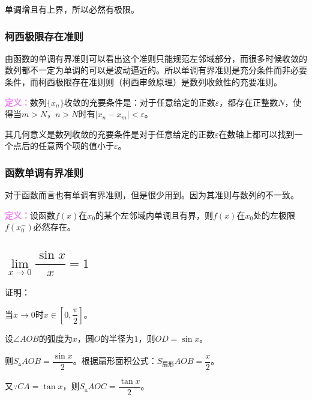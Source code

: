 \documentclass[UTF8, 12pt]{ctexart}
\begin{document}
单调增且有上界，所以必然有极限。

\subsubsection{柯西极限存在准则}

由函数的单调有界准则可以看出这个准则只能规范左邻域部分，而很多时候收敛的数列都不一定为单调的可以是波动逼近的。所以单调有界准则是充分条件而非必要条件，而柯西极限存在准则则（柯西审敛原理）是数列收敛性的充要准则。

\textcolor{violet}{\textbf{定义：}}数列$\{x_n\}$收敛的充要条件是：对于任意给定的正数$\varepsilon$，都存在正整数$N$，使得当$m>N$，$n>N$时有$\vert x_n-x_m\vert<\varepsilon$。

其几何意义是数列收敛的充要条件是对于任意给定的正数$\varepsilon$在数轴上都可以找到一个点后的任意两个项的值小于$\varepsilon$。

\subsubsection{函数单调有界准则}

对于函数而言也有单调有界准则，但是很少用到。因为其准则与数列的不一致。

\textcolor{violet}{\textbf{定义：}}设函数$f(x)$在$x_0$的某个左邻域内单调且有界，则$f(x)$在$x_0$处的左极限$f(x_0^-)$必然存在。

\subsection{\texorpdfstring{$\lim\limits_{x\to 0}\dfrac{\sin x}{x}=1$}{}}

证明：

\begin{minipage}{0.7\linewidth}
    当$x\to 0$时$x\in[0,\dfrac{\pi}{2}]$。

    设$\angle AOB$的弧度为$x$，圆$O$的半径为$1$，则$OD=\sin x$。

    则$S_\vartriangle AOB=\dfrac{\sin x}{2}$。根据扇形面积公式：$S_{\text{扇形}}AOB=\dfrac{x}{2}$。

    又$\because CA=\tan x$，则$S_\vartriangle AOC=\dfrac{\tan x}{2}$。
\end{minipage}
\hfill
\begin{minipage}{0.2\linewidth}
\end{minipage}
\end{document}
